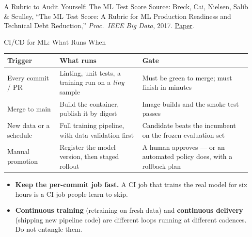 \begin{frame}{A Rubric to Audit Yourself: The ML Test Score}
    \vspace{0.12em}
    {\scriptsize Source: Breck, Cai, Nielsen, Salib \& Sculley, ``The ML Test Score: A Rubric for ML Production
    Readiness and Technical Debt Reduction,'' \textit{Proc.\ IEEE Big Data}, 2017.
    \href{https://research.google/pubs/the-ml-test-score-a-rubric-for-ml-production-readiness-and-technical-debt-reduction/}{Paper}.}

\end{frame}

\begin{frame}{CI/CD for ML: What Runs When}

    \centering
    \renewcommand{\arraystretch}{1.3}
    {\small
    \begin{tabular}{p{3.0cm}|p{4.2cm}|p{4.2cm}}
        \toprule
        \textbf{Trigger} & \textbf{What runs} & \textbf{Gate} \\
        \midrule
        Every commit / PR & Linting, unit tests, a training run on a \emph{tiny} sample &
            Must be green to merge; must finish in minutes \\
        Merge to main     & Build the container, publish it by digest &
            Image builds and the smoke test passes \\
        New data or a schedule & Full training pipeline, with data validation first &
            Candidate beats the incumbent on the frozen evaluation set \\
        Manual promotion  & Register the model version, then staged rollout &
            A human approves --- or an automated policy does, with a rollback plan \\
        \bottomrule
    \end{tabular}}

    \vspace{0.9em}
    \begin{itemize}
        \item \textbf{Keep the per-commit job fast.} A CI job that trains the real model for six hours is a
              CI job people learn to skip.
        \item \textbf{Continuous training} (retraining on fresh data) and \textbf{continuous delivery}
              (shipping new pipeline code) are different loops running at different cadences. Do not
              entangle them.
    \end{itemize}

\end{frame}

